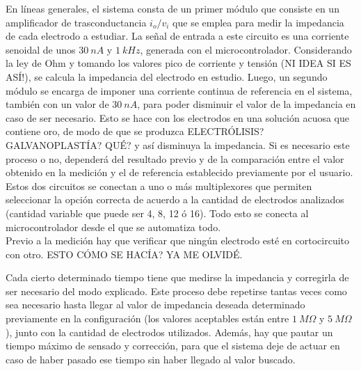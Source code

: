 En líneas generales, el sistema consta de un primer módulo que consiste en un amplificador de trasconductancia $i_o/v_i$ que se emplea para medir la impedancia de cada electrodo a estudiar. La señal de entrada a este circuito es una corriente senoidal de unos $30\ nA$ y $1\ kHz$, generada con el microcontrolador. Considerando la ley de Ohm y tomando los valores pico de corriente y tensión \color{red}(NI IDEA SI ES ASÍ!)\color{black}, se calcula la impedancia del electrodo en estudio. Luego, un segundo módulo se encarga de imponer una corriente continua de referencia en el sistema, también con un valor de $30\ nA$, para poder disminuir el valor de la impedancia en caso de ser necesario. Esto se hace con los electrodos en una solución acuosa que contiene oro, de modo de que se produzca \color{red}ELECTRÓLISIS? GALVANOPLASTÍA? QUÉ?\color{black} y así disminuya la impedancia. Si es necesario este proceso o no, dependerá del resultado previo y de la comparación entre el valor obtenido en la medición y el de referencia establecido previamente por el usuario. Estos dos circuitos se conectan a uno o más multiplexores que permiten seleccionar la opción correcta de acuerdo a la cantidad de electrodos analizados (cantidad variable que puede ser 4, 8, 12 ó 16). Todo esto se conecta al microcontrolador desde el que se automatiza todo.\\ 
	
Previo a la medición hay que verificar que ningún electrodo esté en cortocircuito con otro. \color{red}ESTO CÓMO SE HACÍA? YA ME OLVIDÉ.\\ \color{black}
	
Cada cierto determinado tiempo tiene que medirse la impedancia y corregirla de ser necesario del modo explicado. Este proceso debe repetirse tantas veces como sea necesario hasta llegar al valor de impedancia deseada determinado previamente en la configuración (los valores aceptables están entre $1\ M\Omega$ y $5\ M\Omega$), junto con la cantidad de electrodos utilizados. Además, hay que pautar un tiempo máximo de sensado y corrección, para que el sistema deje de actuar en caso de haber pasado ese tiempo sin haber llegado al valor buscado.\\



